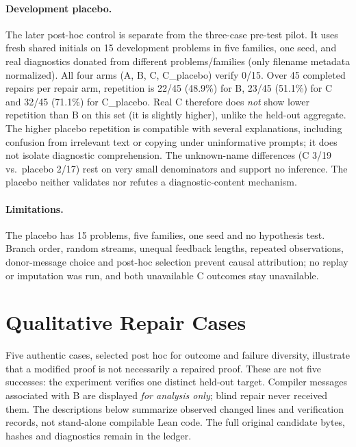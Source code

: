 \documentclass[runningheads,a4paper]{llncs}
\begin{document}
\paragraph{Development placebo.} The later post-hoc control is separate from the
three-case pre-test pilot. It uses fresh shared initials on 15 development problems
in five families, one seed, and real diagnostics donated from different
problems/families (only filename metadata normalized). All four arms (A, B, C,
C\_placebo) verify 0/15. Over 45 completed repairs per repair arm, repetition is
22/45 (48.9\%) for B, 23/45 (51.1\%) for C and 32/45 (71.1\%) for C\_placebo.
Real C therefore does \emph{not} show lower repetition than B on this set (it is
slightly higher), unlike the held-out aggregate. The higher placebo repetition is
compatible with several explanations, including confusion from irrelevant text or
copying under uninformative prompts; it does not isolate diagnostic comprehension.
The unknown-name differences (C 3/19 vs.\ placebo 2/17) rest on very small
denominators and support no inference. The placebo neither validates nor refutes a
diagnostic-content mechanism.

\paragraph{Limitations.} The placebo has 15 problems, five families, one seed and no hypothesis test. Branch order, random streams, unequal feedback lengths, repeated observations, donor-message choice and post-hoc selection prevent causal attribution; no replay or imputation was run, and both unavailable C outcomes stay unavailable.

\section{Qualitative Repair Cases}
Five authentic cases, selected post hoc for outcome and failure diversity,
illustrate that a modified proof is not necessarily a repaired proof. These
are not five successes: the experiment verifies one distinct held-out target.
Compiler messages associated with B are displayed \emph{for analysis only};
blind repair never received them. The descriptions below summarize observed
changed lines and verification records, not stand-alone compilable Lean code.
The full original candidate bytes, hashes and diagnostics remain in the ledger.
\end{document}
